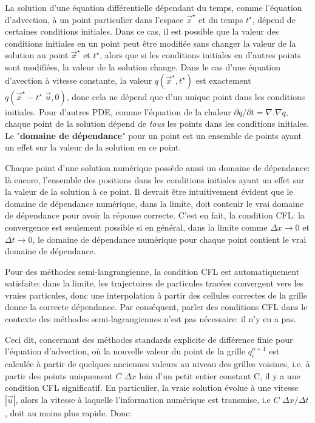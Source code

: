 \documentclass[11pt]{report}
\begin{document}
La solution d'une équation différentielle dépendant du temps, comme l'équation d'advection, à un point particulier dans l'espace $\overrightarrow{x}^\star$ et du temps  $t^\star$, dépend de certaines conditions initiales. Dans ce cas, il est possible que la valeur des conditions initiales en un point peut être modifiée sans changer la valeur de la solution au point $\overrightarrow{x}^\star$ et $t^\star$, alors que si les conditions initiales en d'autres points sont modifiées, la valeur de la solution change. Dans le cas d'une équation d'avection à vitesse constante, la valeur $q(\overrightarrow{x}^\star,t^\star)$ est exactement $q(\overrightarrow{x}^\star - t^\star \,\, \overrightarrow{u}, 0)$, donc cela ne dépend que d'un unique point dans les conditions initiales. Pour d'autres PDE, comme l'équation de la chaleur $\partial q/\partial t = \nabla . \nabla q$, chaque point de la solution dépend de \textit{tous} les points dans les conditions initiales. Le "\textbf{domaine de dépendance}" pour un point est un ensemble de points ayant un effet sur la valeur de la solution en ce point. \newline

Chaque point d'une solution numérique possède aussi un domaine de dépendance: là encore, l'ensemble des positions dans les conditions initiales ayant un effet sur la valeur de la solution à ce point. Il devrait être intuitivement évident que le domaine de dépendance numérique, dans la limite, doit contenir le vrai domaine de dépendance pour avoir la réponse correcte. C'est en fait, la condition CFL: la convergence est seulement possible si en général, dans la limite comme $\Delta x \longrightarrow 0 $ et $\Delta t \longrightarrow 0 $, le domaine de dépendance numérique pour chaque point  contient le vrai domaine de dépendance.\newline

Pour des méthodes semi-langrangienne, la condition CFL est automatiquement satisfaite:  dans la limite, les trajectoires de particules tracées convergent vers les vraies particules, donc une interpolation à partir des cellules correctes de la grille donne la correcte dépendance. Par conséquent, parler des conditions CFL dans le contexte des méthodes semi-lagrangiennes n'est pas nécessaire: il n'y en a pas.\newline

Ceci dit, concernant des méthodes standards explicite de différence finie pour l'équation d'advection, où la nouvelle valeur du point de la grille $q_i^{n+1}$ est calculée à partir de quelques anciennes valeurs au niveau des grilles voisines, i.e. à partir des points uniquement $C \,\, \Delta x$ loin d'un petit entier constant C, il y a une condition CFL significatif. En particulier, la vraie solution évolue à une vitesse $|\overrightarrow{u}|$, alors la vitesse à laquelle l'information numérique est transmise, i.e $ C \,\, \Delta x/\Delta t $, doit au moins plus rapide. Donc:
\end{document}

